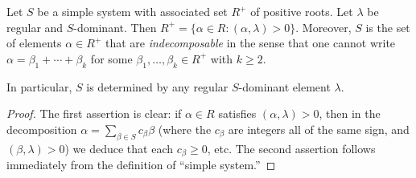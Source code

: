 \documentclass[reqno]{amsart} 
\begin{document}
\begin{lemma}\label{lem:recover-S-from-dominant-element}
  Let $S$ be a simple system with associated set $R^+$ of positive roots.  Let $\lambda$ be regular and $S$-dominant.  Then $R^+ = \{\alpha \in R : (\alpha,\lambda) > 0\}$.  Moreover, $S$ is the set of elements $\alpha \in R^+$ that are \emph{indecomposable} in the sense that one cannot write $\alpha = \beta_1 + \dotsb + \beta_k$ for some $\beta_1,\dotsc,\beta_k \in R^+$ with $k \geq 2$.

  In particular, $S$ is determined by any regular $S$-dominant element $\lambda$.
\end{lemma}
\begin{proof}
  The first assertion is clear: if $\alpha \in R$ satisfies $(\alpha,\lambda) > 0$, then in the decomposition $\alpha = \sum_{\beta \in S} c_\beta \beta$ (where the $c_\beta$ are integers all of the same sign, and $(\beta,\lambda) > 0$) we deduce that each $c_\beta \geq 0$, etc.  The second assertion follows immediately from the definition of ``simple system.''
\end{proof}





\end{document}
